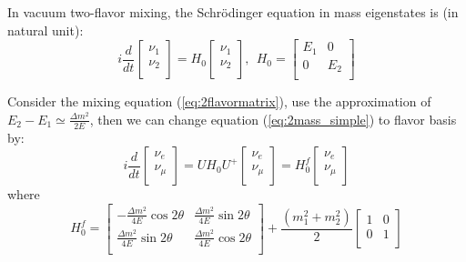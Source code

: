 \documentclass[preprint,12pt]{elsarticle}
\numberwithin{equation}{section}
\begin{document}
In vacuum two-flavor mixing, the Schr\"{o}dinger equation in mass eigenstates is (in natural unit)\cite{xing}:
\begin{equation}\label{eq:2mass_simple}
i\frac{d}{dt}\begin{bmatrix}
\nu_1\\
\nu_2\\
\end{bmatrix}
=H_0
\begin{bmatrix}
\nu_1\\
\nu_2\\
\end{bmatrix},~~H_0 = \begin{bmatrix}
E_1 & 0\\
0 &E_2\\
\end{bmatrix}
\end{equation}

Consider the mixing equation (\ref{eq:2flavormatrix}), use  the approximation of $E_2-E_1\simeq\frac{\Delta m^2}{2E}$, then we can change equation (\ref{eq:2mass_simple}) to flavor basis by:
\begin{equation}\label{eq:2flavor_simple}
i\frac{d}{dt}\begin{bmatrix}
\nu_e\\
\nu_\mu\\
\end{bmatrix}
= UH_0U^+\begin{bmatrix}
\nu_e\\
\nu_\mu\\
\end{bmatrix}
=
H^f_0
\begin{bmatrix}
\nu_e\\
\nu_\mu\\
\end{bmatrix}
\end{equation}
where 
\begin{equation}\label{eq:H0f}
H^f_0 = \begin{bmatrix}
-\frac{\Delta m^2}{4E}\cos 2\theta & \frac{\Delta m^2}{4E}\sin 2\theta\\
\frac{\Delta m^2}{4E}\sin 2\theta &\frac{\Delta m^2}{4E}\cos 2\theta\\
\end{bmatrix}+\frac{(m_1^2+m_2^2)}{2}\begin{bmatrix}
1 & 0\\
0 &1\\
\end{bmatrix}
\end{equation}
\end{document}
